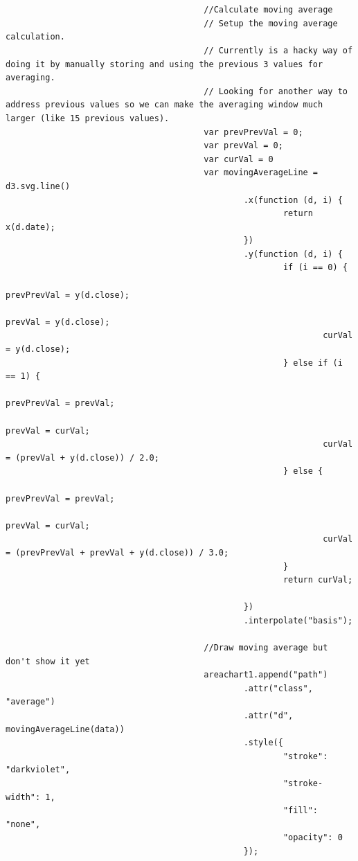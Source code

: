\begin{lstlisting}[gobble=24]


                                        //Calculate moving average
                                        // Setup the moving average calculation.
                                        // Currently is a hacky way of doing it by manually storing and using the previous 3 values for averaging.
                                        // Looking for another way to address previous values so we can make the averaging window much larger (like 15 previous values).
                                        var prevPrevVal = 0;
                                        var prevVal = 0;
                                        var curVal = 0
                                        var movingAverageLine = d3.svg.line()
                                                .x(function (d, i) {
                                                        return x(d.date);
                                                })
                                                .y(function (d, i) {
                                                        if (i == 0) {
                                                                prevPrevVal = y(d.close);
                                                                prevVal = y(d.close);
                                                                curVal = y(d.close);
                                                        } else if (i == 1) {
                                                                prevPrevVal = prevVal;
                                                                prevVal = curVal;
                                                                curVal = (prevVal + y(d.close)) / 2.0;
                                                        } else {
                                                                prevPrevVal = prevVal;
                                                                prevVal = curVal;
                                                                curVal = (prevPrevVal + prevVal + y(d.close)) / 3.0;
                                                        }
                                                        return curVal;

                                                })
                                                .interpolate("basis");

                                        //Draw moving average but don't show it yet
                                        areachart1.append("path")
                                                .attr("class", "average")
                                                .attr("d", movingAverageLine(data))
                                                .style({
                                                        "stroke": "darkviolet",
                                                        "stroke-width": 1,
                                                        "fill": "none",
                                                        "opacity": 0
                                                });
                                                
\end{lstlisting}

